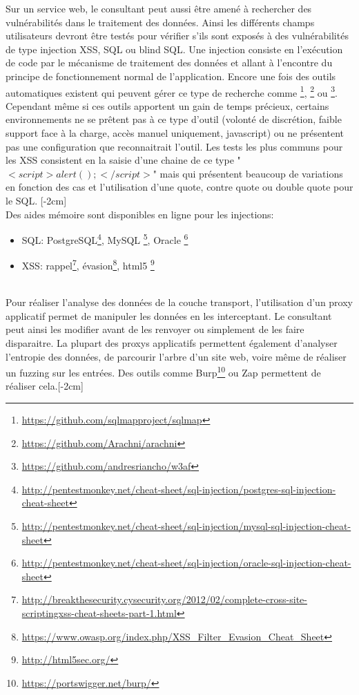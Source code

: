 \documentclass[twoside,a4paper,12pt,titlepage]{book}
\newcommand{\MarginPar}[2]{\marginnote{\scriptsize #1}[#2]}
\begin{document}
	Sur un service web, le consultant peut aussi être amené à rechercher des vulnérabilités dans le traitement des données. Ainsi les différents champs utilisateurs devront être testés pour vérifier s'ils sont exposés à des vulnérabilités de type injection \gls{XSS}, \gls{SQL} ou blind SQL. Une injection consiste en l'exécution de code par le mécanisme de traitement des données et allant à l'encontre du principe de fonctionnement normal de l'application. Encore une fois des outils automatiques existent qui peuvent gérer ce type de recherche comme \footnote{\url{https://github.com/sqlmapproject/sqlmap}}, \footnote{\url{https://github.com/Arachni/arachni}} ou \footnote{\url{https://github.com/andresriancho/w3af}}. Cependant même si ces outils apportent un gain de temps précieux, certains environnements ne se prêtent pas à ce type d'outil (volonté de discrétion, faible support face à la charge, accès manuel uniquement, javascript) ou ne présentent pas une configuration que reconnaitrait l'outil. Les tests les plus communs pour les XSS consistent en la saisie d'une chaine de ce type "$<script>alert();</script>$" mais qui présentent beaucoup de variations en fonction des cas et l'utilisation d'une quote, contre quote ou double quote pour le SQL. \MarginPar{\textbf{Injection XSS/SQL}}{-2cm} \\
Des aides mémoire sont disponibles en ligne pour les injections:\begin{itemize}
	\item \gls{SQL}: PostgreSQL\footnote{\url{http://pentestmonkey.net/cheat-sheet/sql-injection/postgres-sql-injection-cheat-sheet}}, MySQL \footnote{\url{http://pentestmonkey.net/cheat-sheet/sql-injection/mysql-sql-injection-cheat-sheet}}, Oracle \footnote{\url{http://pentestmonkey.net/cheat-sheet/sql-injection/oracle-sql-injection-cheat-sheet}}
	\item \gls{XSS}: rappel\footnote{\url{http://breakthesecurity.cysecurity.org/2012/02/complete-cross-site-scriptingxss-cheat-sheets-part-1.html}}, évasion\footnote{\url{https://www.owasp.org/index.php/XSS\_Filter\_Evasion\_Cheat\_Sheet}}, html5 \footnote{\url{http://html5sec.org/}}\\
		 \\
\end{itemize}

Pour réaliser l'analyse des données de la couche transport, l'utilisation d'un proxy applicatif permet de manipuler les données en les interceptant. Le consultant peut ainsi les modifier avant de les renvoyer ou simplement de les faire disparaitre. La plupart des proxys applicatifs permettent également d'analyser l'entropie des données, de parcourir l'arbre d'un site web, voire même de réaliser un fuzzing sur les entrées. Des outils comme Burp\footnote{\url{https://portswigger.net/burp/}} ou Zap permettent de réaliser cela.\MarginPar{\textbf{Proxy Applicatifs}}{-2cm}\\
\end{document}
